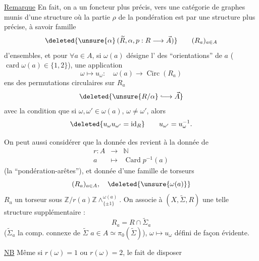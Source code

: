 
\uline{Remarque} En fait, on a un foncteur plus précis, vers une catégorie de graphes munis d'une structure où la partie $\rho$ de la pondération est   par une structure plus précise, à savoir   famille
\[
 \deleted{\unsure{\alpha}\,(\widetilde R,\alpha,p:R\longrightarrow\vec A)}
 \qquad (R_a)_{a\in A}
\]
d'ensembles, et pour $\forall a\in A$, si $\omega(a)$ désigne l' des
``orientations'' de $a$ ($\operatorname{card}\omega(a)\in\{1,2\}$), une application
\[
 \omega\longmapsto u_\omega:\quad \omega(a)\longrightarrow\operatorname{Circ}(R_a)
\]
ens des permutations circulaires sur $R_a$
\[
 \deleted{\unsure{R/\alpha}\lhook\joinrel\longrightarrow\vec A}
\]
avec la condition que si $\omega,\omega'\in\omega(a)$, $\omega\ne\omega'$, alors
\[
 \deleted{u_\omega u_{\omega'}=\operatorname{id}_R}
 \qquad u_{\omega'}=u_\omega^{-1}.
\]

On peut aussi considérer que la donnée des  revient à la donnée de
\[
 \begin{array}{rcl}
 r:A&\longrightarrow&\mathbb N\\
 a&\longmapsto&\operatorname{Card}p^{-1}(a)
 \end{array}
\]
(la ``pondération-arêtes''), et  donnée d'une famille de torseurs
\[
 (R_a)_{a\in A},\quad \deleted{\unsure{\omega(a)}}
\]
$R_a$ un torseur sous $\mathbb Z/r(a)\mathbb Z\mathbin{\wedge}^{\omega(a)}_{\{\pm1\}}$.
On associe à $(X,\widetilde\Sigma,R)$ une telle structure supplémentaire :
\[
 R_a=R\cap\widetilde\Sigma_a
\]
($\widetilde\Sigma_a$ la comp. connexe de $\widetilde\Sigma$   $a\in A\simeq\pi_0(\widetilde\Sigma)$),
$\omega\longmapsto u_\omega$ défini de façon évidente.

\uline{NB} Même si $r(\omega)=1$ ou $r(\omega)=2$, le fait de disposer
